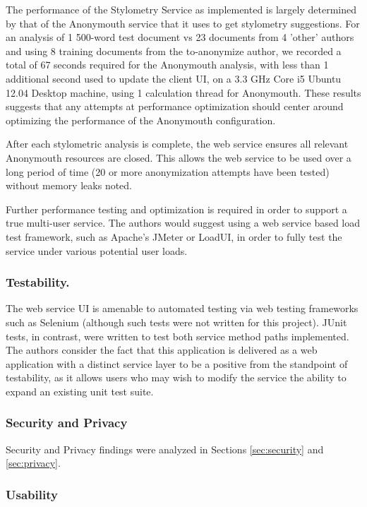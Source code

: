 \documentclass[letterpaper]{article}
\begin{document}
The performance of the Stylometry Service as implemented is largely
determined by that of the Anonymouth service that it uses to get
stylometry suggestions. For an analysis of 1 500-word test document vs
23 documents from 4 'other' authors and using 8 training documents
from the to-anonymize author, we recorded a total of 67 seconds
required for the Anonymouth analysis, with less than 1 additional
second used to update the client UI, on a 3.3 GHz Core i5 Ubuntu 12.04
Desktop machine, using 1 calculation thread for Anonymouth. These
results suggests that any attempts at performance optimization should
center around optimizing the performance of the Anonymouth
configuration.

After each stylometric analysis is complete, the web service ensures
all relevant Anonymouth resources are closed. This allows the web
service to be used over a long period of time (20 or more
anonymization attempts have been tested) without memory leaks noted.

Further performance testing and optimization is required in order to
support a true multi-user service. The authors would suggest using a
web service based load test framework, such as Apache's JMeter or
LoadUI, in order to fully test the service under various potential
user loads.

\subsubsection{Testability.}

The web service UI is amenable to automated testing via web testing
frameworks such as Selenium (although such tests were not written for
this project). JUnit tests, in contrast, were written to test both
service method paths implemented. The authors consider the fact that
this application is delivered as a web application with a distinct
service layer to be a positive from the standpoint of testability, as
it allows users who may wish to modify the service the ability to
expand an existing unit test suite.

\subsubsection{Security and Privacy}

Security and Privacy findings were analyzed in Sections
\ref{sec:security} and \ref{sec:privacy}.

\subsubsection{Usability}
\end{document}
